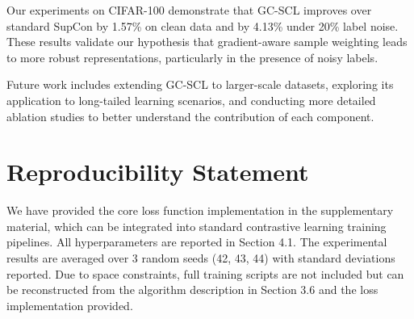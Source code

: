 \documentclass{article}
\begin{document}
Our experiments on CIFAR-100 demonstrate that GC-SCL improves over standard SupCon by 1.57\% on clean data and by 4.13\% under 20\% label noise. These results validate our hypothesis that gradient-aware sample weighting leads to more robust representations, particularly in the presence of noisy labels.

Future work includes extending GC-SCL to larger-scale datasets, exploring its application to long-tailed learning scenarios, and conducting more detailed ablation studies to better understand the contribution of each component.

\section*{Reproducibility Statement}

We have provided the core loss function implementation in the supplementary material, which can be integrated into standard contrastive learning training pipelines. All hyperparameters are reported in Section 4.1. The experimental results are averaged over 3 random seeds (42, 43, 44) with standard deviations reported. Due to space constraints, full training scripts are not included but can be reconstructed from the algorithm description in Section 3.6 and the loss implementation provided.
\end{document}
